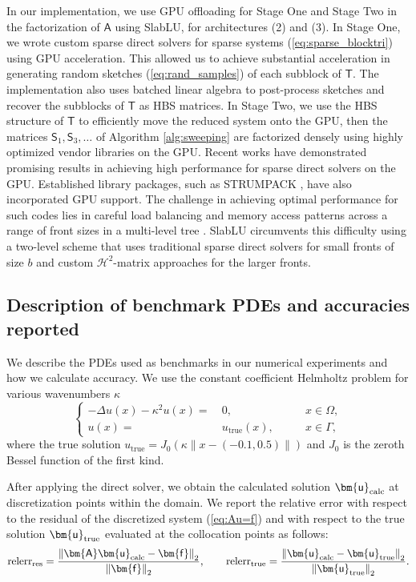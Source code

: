 \documentclass[11pt]{amsart}
\newcommand{\mtx}[1]{\bm{\mathsf{#1}}}
\begin{document}
In our implementation, we use GPU offloading for Stage One and Stage Two in the factorization of $\mtx A$ using SlabLU, for architectures (2) and (3).
In Stage One, we wrote custom sparse direct solvers for sparse systems (\ref{eq:sparse_blocktri}) using GPU acceleration.
This allowed us to achieve substantial acceleration in generating random sketches (\ref{eq:rand_samples}) of each subblock of $\mtx T$.
The implementation also uses batched linear algebra \cite{abdelfattah2021set} to post-process sketches and recover the subblocks of $\mtx T$
as HBS matrices. In Stage Two, we use the HBS structure of $\mtx T$ to efficiently move the reduced
system onto the GPU, then the matrices $\mtx S_1, \mtx S_3, \dots$ of Algorithm  \ref{alg:sweeping} are factorized 
densely using highly optimized vendor libraries on the GPU.
Recent works \cite{ghysels2022high,abdelfattah2022addressing} have demonstrated promising results in achieving high performance for sparse direct solvers 
on the GPU. Established library packages, such as STRUMPACK \cite{strumpack_doecode}, have also incorporated GPU support. 
The challenge in achieving optimal performance for such codes lies in careful load balancing and memory access patterns across a range of front sizes
in a multi-level tree \cite{vuduc2010limits,kim2013scheduling}.
SlabLU circumvents this difficulty using a two-level scheme that uses traditional sparse direct solvers for small fronts of size $b$ and
custom $\mathcal H^2$-matrix approaches for the larger fronts.

\subsection{Description of benchmark PDEs and accuracies reported}
We describe the PDEs used as benchmarks in our numerical experiments and how we calculate accuracy.
We use the constant coefficient Helmholtz problem for various wavenumbers $\kappa$
\begin{equation}
\left\{\begin{aligned}
-\Delta u(x)  - \kappa^2 u(x) =&\ 0,\qquad&x \in \Omega,\\
u(x) =&\ u_{\text{true}}(x),\qquad&x \in \Gamma,
\end{aligned}\right. 
\label{eq:constant_coeff_helm}
\end{equation}
where the true solution $u_{\text{true}} = J_0 \left( \kappa \|x - (-0.1,0.5)\| \right)$
and $J_{0}$ is the zeroth Bessel function of the first kind.

After applying the direct solver, we obtain the calculated solution $\mtx u_{\rm calc}$ at discretization points within the domain.
We report the relative error with respect to the residual of the discretized system (\ref{eq:Au=f}) and with respect to the
true solution $\mtx u_{\rm true}$ evaluated at the collocation points as follows:
\begin{equation} {\rm relerr}_{\rm res} = \frac{{\|\mtx A \mtx u_{\text{calc}} - \mtx f\|}_2}{{\|\mtx f\|}_2}, 
\qquad {\rm relerr}_{ \rm true} = \frac{{\|\mtx u_{\rm calc} - \mtx u_{\rm true}\|}_2}{{\| \mtx u_{\rm true}\|}_2}.\end{equation}
\end{document}
